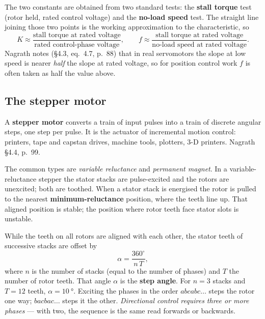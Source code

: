 \documentclass[11pt,a4paper]{article}
\begin{document}
The two constants are obtained from two standard tests: the \textbf{stall
torque} test (rotor held, rated control voltage) and the \textbf{no-load speed}
test. The straight line joining those two points is the working approximation
to the characteristic, so
\[
  K\approx\frac{\text{stall torque at rated voltage}}
                {\text{rated control-phase voltage}},
  \qquad
  f\approx\frac{\text{stall torque at rated voltage}}
                {\text{no-load speed at rated voltage}} .
\]
Nagrath notes (\S4.3, eq.~4.7, p.~88) that in real servomotors the slope at low
speed is nearer \emph{half} the slope at rated voltage, so for position control
work $f$ is often taken as half the value above.

\subsection{The stepper motor}

A \textbf{stepper motor} converts a train of input pulses into a train of
discrete angular steps, one step per pulse. It is the actuator of incremental
motion control: printers, tape and capstan drives, machine tools, plotters,
3-D printers. Nagrath \S4.4, p.~99.

The common types are \emph{variable reluctance} and \emph{permanent magnet}. In
a variable-reluctance stepper the stator stacks are pulse-excited and the
rotors are unexcited; both are toothed. When a stator stack is energised the
rotor is pulled to the nearest \textbf{minimum-reluctance} position, where the
teeth line up. That aligned position is stable; the position where rotor teeth
face stator slots is unstable.

While the teeth on all rotors are aligned with each other, the stator teeth of
successive stacks are offset by
\begin{equation}
  \alpha=\frac{360^\circ}{n\,T},
  \label{eq:step}
\end{equation}
where $n$ is the number of stacks (equal to the number of phases) and $T$ the
number of rotor teeth. That angle $\alpha$ is the \textbf{step angle}. For
$n=3$ stacks and $T=12$ teeth, $\alpha=\SI{10}{\degree}$. Exciting the phases
in the order $abcabc\ldots$ steps the rotor one way; $bacbac\ldots$ steps it
the other. \emph{Directional control requires three or more phases} --- with
two, the sequence is the same read forwards or backwards.
\end{document}
